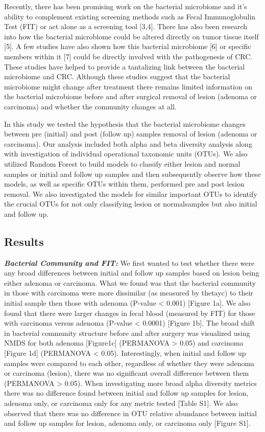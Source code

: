 \documentclass[12pt,]{article}
\begin{document}
Recently, there has been promising work on the bacterial microbiome and
it's ability to complement existing screening methods such as Fecal
Immunoglobulin Test (FIT) or act alone as a screening tool {[}3,4{]}.
There has also been research into how the bacterial microbiome could be
altered directly on tumor tissue itself {[}5{]}. A few studies have also
shown how this bacterial microbiome {[}6{]} or specific members within
it {[}7{]} could be directly involved with the pathogenesis of CRC.
These studies have helped to provide a tantalizing link between the
bacterial microbiome and CRC. Although these studies suggest that the
bacterial microbiome might change after treatment there remains limited
information on the bacterial microbiome before and after surgical
removal of lesion (adenoma or carcinoma) and whether the community
changes at all.

In this study we tested the hypothesis that the bacterial microbiome
changes between pre (initial) and post (follow up) samples removal of
lesion (adenoma or carcinoma). Our analysis included both alpha and beta
diversity analysis along with investigation of individual operational
taxonomic units (OTUs). We also utilized Random Forest to build models
to classify either lesion and normal samples or initial and follow up
samples and then subsequently observe how these models, as well as
specific OTUs within them, performed pre and post lesion removal. We
also investigated the models for similar important OTUs to identify the
crucial OTUs for not only classifying lesion or normalsamples but also
initial and follow up.

\newpage

\subsection{Results}\label{results}

\textbf{\emph{Bacterial Community and FIT:}} We first wanted to test
whether there were any broad differences between initial and follow up
samples based on lesion being either adenoma or carcinoma. What we found
was that the bacterial community in those with carcinoma were more
dissimilar (as measured by thetayc) to their initial sample then those
with adenoma (P-value \textless{} 0.001) {[}Figure 1a{]}. We also found
that there were larger changes in fecal blood (measured by FIT) for
those with carcinoma versus adenoma (P-value \textless{} 0.0001)
{[}Figure 1b{]}. The broad shift in bacterial community structure before
and after surgery was visualized using NMDS for both adenoma
{[}Figure1c{]} (PERMANOVA \textgreater{} 0.05) and carcinoma {[}Figure
1d{]} (PERMANOVA \textless{} 0.05). Interestingly, when initial and
follow up samples were compared to each other, regardless of whether
they were adenoma or carcinoma (lesion), there was no significant
overall difference between them (PERMANOVA \textgreater{} 0.05). When
investigating more broad alpha diversity metrics there was no difference
found between initial and follow up samples for lesion, adenoma only, or
carcinoma only for any metric tested {[}Table S1{]}. We also observed
that there was no difference in OTU relative abundance between initial
and follow up samples for lesion, adenoma only, or carcinoma only
{[}Figure S1{]}.
\end{document}
